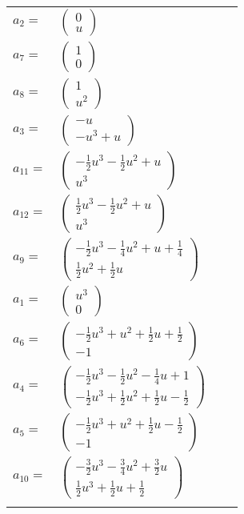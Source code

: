 \documentclass[1p]{elsarticle_modified}
\theoremstyle{definition}
\begin{document}
\begin{tabular}{m{7pt} m{180pt} m{7pt} m{180pt} }
\flushright $a_{2}=$&$\begin{pmatrix}0\\u\end{pmatrix}$ \\
\flushright $a_{7}=$&$\begin{pmatrix}1\\0\end{pmatrix}$ \\
\flushright $a_{8}=$&$\begin{pmatrix}1\\u^2\end{pmatrix}$ \\
\flushright $a_{3}=$&$\begin{pmatrix}- u\\- u^3+u\end{pmatrix}$ \\
\flushright $a_{11}=$&$\begin{pmatrix}-\frac{1}{2} u^3-\frac{1}{2} u^2+u\\u^3\end{pmatrix}$ \\
\flushright $a_{12}=$&$\begin{pmatrix}\frac{1}{2} u^3-\frac{1}{2} u^2+u\\u^3\end{pmatrix}$ \\
\flushright $a_{9}=$&$\begin{pmatrix}-\frac{1}{2} u^3-\frac{1}{4} u^2+u+\frac{1}{4}\\\frac{1}{2} u^2+\frac{1}{2} u\end{pmatrix}$ \\
\flushright $a_{1}=$&$\begin{pmatrix}u^3\\0\end{pmatrix}$ \\
\flushright $a_{6}=$&$\begin{pmatrix}-\frac{1}{2} u^3+u^2+\frac{1}{2} u+\frac{1}{2}\\-1\end{pmatrix}$ \\
\flushright $a_{4}=$&$\begin{pmatrix}-\frac{1}{2} u^3-\frac{1}{2} u^2-\frac{1}{4} u+1\\-\frac{1}{2} u^3+\frac{1}{2} u^2+\frac{1}{2} u-\frac{1}{2}\end{pmatrix}$ \\
\flushright $a_{5}=$&$\begin{pmatrix}-\frac{1}{2} u^3+u^2+\frac{1}{2} u-\frac{1}{2}\\-1\end{pmatrix}$ \\
\flushright $a_{10}=$&$\begin{pmatrix}-\frac{3}{2} u^3-\frac{3}{4} u^2+\frac{3}{2} u\\\frac{1}{2} u^3+\frac{1}{2} u+\frac{1}{2}\end{pmatrix}$\\&\end{tabular}
\end{document}
